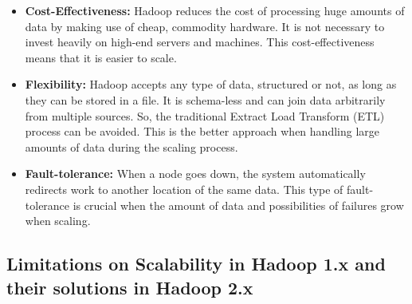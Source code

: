\documentclass[a4paper,12pt,oneside]{report}
\begin{document}
\begin{itemize}

        \item \textbf{Cost-Effectiveness:} Hadoop reduces the cost of processing huge amounts of data by making use of cheap, commodity hardware. 
                It is not necessary to invest heavily on high-end servers and machines. 
                This cost-effectiveness means that it is easier to scale.

        \item \textbf{Flexibility:} Hadoop accepts any type of data, structured or not, as long as they can be stored in a file. 
                It is schema-less and can join data arbitrarily from multiple sources. 
                So, the traditional Extract Load Transform (ETL) process can be avoided. 
                This is the better approach when handling large amounts of data during the scaling process.

        \item \textbf{Fault-tolerance:} When a node goes down, the system automatically redirects work to another location of the same data. 
                This type of fault-tolerance is crucial when the amount of data and possibilities of failures grow when scaling.

\end{itemize}

\subsection{Limitations on Scalability in Hadoop 1.x and their solutions in Hadoop 2.x}
\end{document}
